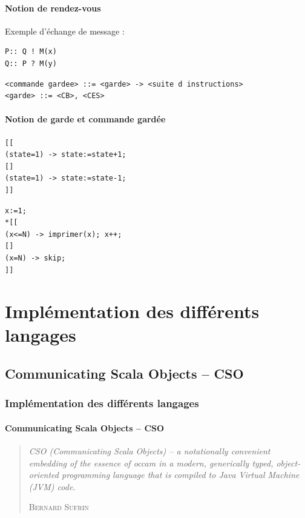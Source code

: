 \documentclass[slidetop,11pt]{beamer}
\begin{document}
\begin{frame} [containsverbatim]
\framesubtitle{Notion de rendez-vous}
Exemple d'échange de message :
\begin{lstlisting}[frame=trBL]
P:: Q ! M(x)
Q:: P ? M(y)
\end{lstlisting}

 \begin{lstlisting}[frame=trBL]
<commande gardee> ::= <garde> -> <suite d instructions>
<garde> ::= <CB>, <CES>
\end{lstlisting}
\end{frame}

\begin{frame} [containsverbatim]
\framesubtitle{Notion de garde et commande gardée}



\begin{lstlisting}[frame=trBL,title={Sélective}]
[[
(state=1) -> state:=state+1;
[]
(state=1) -> state:=state-1;
]]
\end{lstlisting}

\begin{lstlisting}[frame=trBL,title={Répétitive}]
x:=1;
*[[
(x<=N) -> imprimer(x); x++;
[]
(x=N) -> skip;
]]
\end{lstlisting}
\end{frame}

\section{Implémentation des différents langages}
\subsection{Communicating Scala Objects – CSO}
\begin{frame} 
  \frametitle{Implémentation des différents langages}
  \framesubtitle{Communicating Scala Objects – CSO}
  \begin{quotation}
     \textit{\og CSO (Communicating Scala Objects) – a notationally convenient embedding of the essence of occam in a modern, generically typed, object-oriented programming language that is compiled to Java Virtual Machine (JVM) code.\fg}
   \begin{flushright}
\textsc{Bernard Sufrin}
\end{flushright}
\end{quotation}   
\end{frame}
\end{document}
